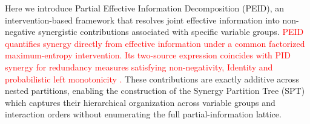 \documentclass[fleqn,10pt]{wlscirep}
\newcommand{\rev}[1]{\textcolor{red}{#1}}
\theoremstyle{naturetheorem}
\begin{document}


Here we introduce Partial Effective Information Decomposition (PEID), an intervention-based framework that resolves joint effective information into non-negative synergistic contributions associated with specific variable groups. \rev{PEID quantifies synergy directly from effective information under a common factorized maximum-entropy intervention. Its two-source expression coincides with PID synergy for redundancy measures satisfying non-negativity, Identity and probabilistic left monotonicity \cite{Harder2013BivariateRedundancy,Rauh2017ExtractableSharedInformation}.} These contributions are exactly additive across nested partitions, enabling the construction of the Synergy Partition Tree (SPT) which captures their hierarchical organization across variable groups and interaction orders without enumerating the full partial-information lattice.
\end{document}
